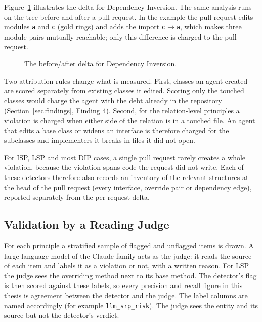 Figure~\ref{fig:delta-harness} illustrates the delta for Dependency Inversion. The same analysis runs
on the tree before and after a pull request. In the example the pull request edits modules \texttt{a}
and \texttt{c} (gold rings) and adds the import \texttt{c}$\rightarrow$\texttt{a}, which makes three
module pairs mutually reachable; only this difference is charged to the pull request.

\begin{figure}[htb]
\centering

\caption{The before/after delta for Dependency Inversion.}
\label{fig:delta-harness}
\end{figure}

Two attribution rules change what is measured. First, classes an agent created are scored separately
from existing classes it edited. Scoring only the touched classes would charge the agent with the
debt already in the repository (Section~\ref{sec:findings}, Finding 4). Second, for the
relation-level principles a violation is charged when either side of the relation is in a touched
file. An agent that edits a base class or widens an interface is therefore charged for the
subclasses and implementers it breaks in files it did not open.

For ISP, LSP and most DIP cases, a single pull request rarely creates a whole violation, because the
violation spans code the request did not write. Each of these detectors therefore also records an
inventory of the relevant structures at the head of the pull request (every interface, override
pair or dependency edge), reported separately from the per-request delta.

\subsection{Validation by a Reading Judge}
\label{sec:reading-judge}

For each principle a stratified sample of flagged and unflagged items is drawn. A large language
model of the Claude family acts as the judge: it reads the source of each item and labels it as a
violation or not, with a written reason. For LSP the judge sees the overriding method next to its
base method. The detector's flag is then scored against these labels, so every precision and recall
figure in this thesis is agreement between the detector and the judge. The label columns are named
accordingly (for example \texttt{llm\_srp\_risk}). The judge sees the entity and its source but not
the detector's verdict.

